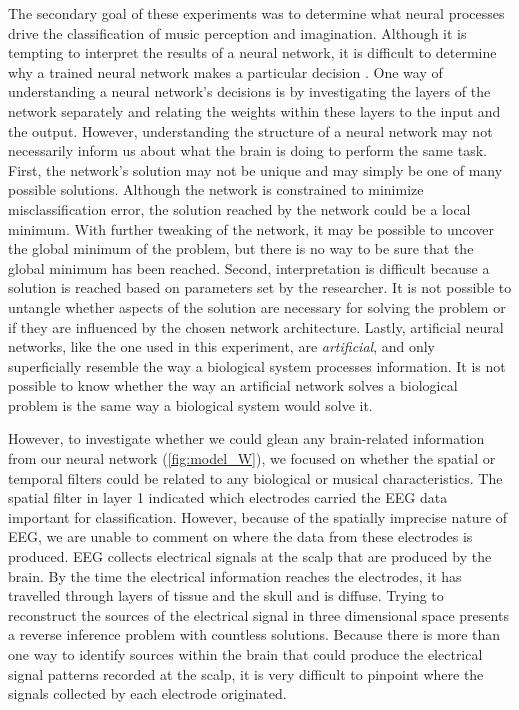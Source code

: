 The secondary goal of these experiments was to determine what neural processes drive the classification of music perception and imagination.
Although it is tempting to interpret the results of a neural network, it is difficult to determine why a trained neural network makes a particular decision \cite{towell_1992_interpretation}.
One way of understanding a neural network's decisions is by investigating the layers of the network separately and relating the weights within these layers to the input and the output. 
However, understanding the structure of a neural network may not necessarily inform us about what the brain is doing to perform the same task. 
First, the network's solution may not be unique and may simply be one of many possible solutions. 
Although the network is constrained to minimize misclassification error, the solution reached by the network could be a local minimum. 
With further tweaking of the network, it may be possible to uncover the global minimum of the problem, but there is no way to be sure that the global minimum has been reached.
Second, interpretation is difficult because a solution is reached based on parameters set by the researcher. 
It is not possible to untangle whether aspects of the solution are necessary for solving the problem or if they are influenced by the chosen network architecture. 
Lastly, artificial neural networks, like the one used in this experiment, are \emph{artificial}, and only superficially resemble the way a biological system processes information. 
It is not possible to know whether the way an artificial network solves a biological problem is the same way a biological system would solve it. 

However, to investigate whether we could glean any brain-related information from our neural network (\autoref{fig:model_W}), we focused on whether the spatial or temporal filters could be related to any biological or musical characteristics.
The spatial filter in layer 1 indicated which electrodes carried the \ac{EEG} data important for classification. 
However, because of the spatially imprecise nature of \ac{EEG}, we are unable to comment on where the data from these electrodes is produced.
\ac{EEG} collects electrical signals at the scalp that are produced by the brain.
By the time the electrical information reaches the electrodes, it has travelled through layers of tissue and the skull and is diffuse.
Trying to reconstruct the sources of the electrical signal in three dimensional space presents a reverse inference problem with countless solutions.
Because there is more than one way to identify sources within the brain that could produce the electrical signal patterns recorded at the scalp, it is very difficult to pinpoint where the signals collected by each electrode originated.

